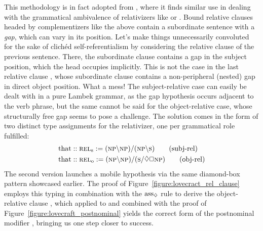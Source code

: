 This methodology is in fact adopted from \citet{moortgat1999constants}, where it finds similar use in dealing with the grammatical ambivalence of relativizers like  or .
Bound relative clauses headed by complementizers like the above contain a subordinate sentence with a \textit{gap}, which can vary in its position.
Let's make things unnecessarily convoluted for the sake of clich{\'e}d self-referentialism by considering the relative clause  of the previous sentence.
There, the subordinate clause  contains a gap in the subject position, which the head  occupies implicitly.
This is not the case in the last relative clause , whose subordinate clause  contains a non-peripheral (nested) gap in direct object position.
What a mess! 
The subject-relative case can easily be dealt with in a pure Lambek grammar, as the gap hypothesis occurs adjacent to the verb phrase, but
the same cannot be said for the object-relative case, whose structurally free gap seems to pose a challenge.
The solution comes in the form of two distinct type assignments for the relativizer, one per grammatical role fulfilled:
\begin{align*}
	\w{that} &:: \subcat{l}{rel}{s} := (\np\divleft\np)\divright(\np\divleft\s) \tag{subj-rel}\\
	\w{that} &:: \subcat{l}{rel}{o} := (\np\divleft\np)\divright(\s\divright\diamond\Box \np ) \tag{obj-rel}
\end{align*}
The second version launches a mobile \np[s] hypothesis via the same diamond-box pattern showcased earlier.
The proof of Figure~\ref{figure:lovecract_rel_clause} employs this typing in combination with the $\rulestyle{ass}_{\diamond}$ rule to derive the object-relative clause , which applied to  and combined with the proof of Figure~\ref{figure:lovecraft_postnominal} yields the correct form of the postnominal modifier , bringing us one step closer to success.

